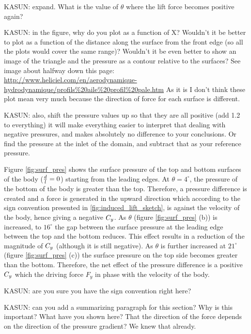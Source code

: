 KASUN: expand. What is the value of $\theta$ where the lift force becomes positive again? 
 
 

KASUN: in the figure, why do you plot as a function of X? Wouldn't it be better to plot as a function of the distance along the surface from the front edge (so all the plots would cover the same range)? Wouldn't it be even better to show an image of the triangle and the pressure as a contour relative to the surfaces? See image about halfway down this page: \url{http://www.heliciel.com/en/aerodynamique-hydrodynamique/profils\%20aile\%20profil\%20pale.htm} As it is I don't think these plot mean very much because the direction of force for each surface is different.

KASUN: also, shift the pressure values up so that they are all positive (add 1.2 to everything) it will make everything easier to interpret that dealing with negative pressures, and makes absolutely no difference to your conclusions. Or find the pressure at the inlet of the domain, and subtract that as your reference pressure.
 
Figure \ref{fig:surf_pres} shows the surface pressure of the top and bottom surfaces of the body ($\frac{d}{l}=0$) starting from  the leading edges. At $\theta=4^{\circ}$, the pressure of the bottom of the body is greater than the top. Therefore, a pressure difference is created and a force is generated in the upward direction which according to the sign convention presented in \ref{fig:induced_lift_sketch}, is against the velocity of the body, hence giving a negative $C_{y}$. As $\theta$ (figure \ref{fig:surf_pres} (b)) is increased, to $16^{\circ}$ the gap between the surface pressure at the leading edge between the top and the bottom reduces. This effect results in a reduction of the magnitude of $C_{y}$ (although it is still negative). As $\theta$ is further increased at $21^{\circ}$ (figure \ref{fig:surf_pres} (c)) the surface pressure on the top side becomes greater than the bottom. Therefore, the net effect of the pressure difference is a positive $C_{y}$ which the driving force $F_y$ in phase with the velocity of the body.

KASUN: are you sure you have the sign convention right here?

KASUN: can you add a summarizing paragraph for this section? Why is this important? What have you shown here? That the direction of the force depends on the direction of the pressure gradient? We knew that already.


